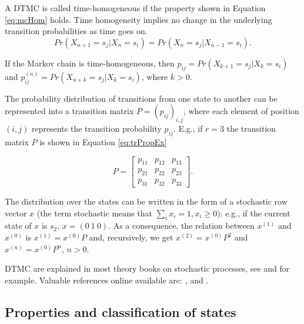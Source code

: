 \documentclass[
  nojss]{jss}
\begin{document}
A DTMC is called time-homogeneous if the property shown in Equation \ref{eq:mcHom} holds. Time homogeneity implies no change in the underlying transition probabilities as time goes on.
\begin{equation}
Pr\left(X_{n+1}=s_{j}\left|X_{n}=s_{i}\right.\right)=Pr\left(X_{n}=s_{j}\left|X_{n-1}=s_{i}\right.\right).
\label{eq:mcHom}
\end{equation}

If the Markov chain is time-homogeneous, then \(p_{ij}=Pr\left(X_{k+1}=s_{j}\left|X_{k}=s_{i}\right.\right)\) and \newline \(p_{ij}^{(n)}=Pr\left(X_{n+k}=s_{j}\left|X_{k}=s_{i}\right.\right)\), where \(k>0\).

The probability distribution of transitions from one state to another can be represented into a transition matrix \(P=(p_{ij})_{i,j}\), where each element of position \((i,j)\) represents the transition probability \(p_{ij}\). E.g., if \(r=3\) the transition matrix \(P\) is shown in Equation \ref{eq:trPropEx}

\begin{equation}
P=\left[\begin{array}{ccc}
p_{11} & p_{12} & p_{13}\\
p_{21} & p_{22} & p_{23}\\
p_{31} & p_{32} & p_{33}
\end{array}\right].
\label{eq:trPropEx}
\end{equation}

The distribution over the states can be written in the form of a stochastic row vector \(x\) (the term stochastic means that \(\sum_{i}x_{i}=1, x_{i} \geq 0\)): e.g., if the current state of \(x\) is \(s_{2}\), \(x=\left(0\:1\:0\right)\). As a consequence, the relation between \(x^{(1)}\) and \(x^{(0)}\) is \(x^{(1)}=x^{(0)}P\) and, recursively, we get \(x^{(2)}=x^{(0)}P^{2}\) and \(x^{(n)}=x^{(0)}P^{n},\, n>0\).

DTMC are explained in most theory books on stochastic processes, see \cite{bremaud1999discrete} and \cite{dobrow2016introduction} for example. Valuable references online available are: \cite{konstantopoulos2009markov}, \cite{probBook} and \cite{bardPpt}.

\hypertarget{sec:properties}{%
\subsection{Properties and classification of states}\label{sec:properties}}
\end{document}
